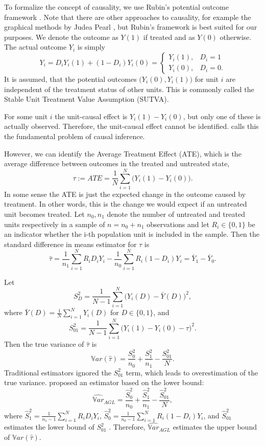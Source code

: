 \documentclass[aodsor,preprint]{imsart}
\numberwithin{equation}{section}
\theoremstyle{plain}
\newcommand{\Var}{{\mathbb{V}ar}}
\begin{document}
To formalize the concept of causality, we use Rubin's potential outcome framework \citep{Rubin_2005}. Note that there are other approaches to causality, for example the graphical methods by Judea Pearl \citep[see for example][]{Pearl_2009}, but Rubin's framework is best suited for our purposes. We denote the outcome as $Y(1)$ if treated and as $Y(0)$ otherwise. The actual outcome $Y_i$ is simply
$$
Y_i = D_i Y_i(1) + (1-D_i) Y_i(0) = \begin{cases}
	Y_i(1), & D_i = 1 \\
	Y_i(0), & D_i = 0.
\end{cases}
$$
It is assumed, that the potential outcomes $\big(Y_i(0), Y_i(1)\big)$ for unit $i$ are independent of the treatment status of other units. This is commonly called the Stable Unit Treatment Value Assumption (SUTVA).

For some unit $i$ the unit-causal effect is $Y_i(1) - Y_i(0)$, but only one of these is actually observed. Therefore, the unit-causal effect cannot be identified. \cite{Holland_1986} calls this the fundamental problem of causal inference.

However, we can identify the Average Treatment Effect (ATE), which is the average difference between outcomes in the treated and untreated state,
$$
\tau := ATE = \frac{1}{N} \sum_{i = 1}^{N} \big( Y_i(1) - Y_i(0) \big).
$$
In some sense the ATE is just the expected change in the outcome caused by treatment. In other words, this is the change we would expect if an untreated unit becomes treated. Let $n_0, n_1$ denote the number of untreated and treated units respectively in a sample of $n = n_0 + n_1$ observations and let $R_i \in \{0, 1\}$ be an indicator whether the i-th population unit is included in the sample. Then the standard difference in means estimator for $\tau$ is
$$
\widehat{\tau} = \frac{1}{n_1} \sum_{i = 1}^{N} R_i D_i Y_i - \frac{1}{n_0} \sum_{i = 1}^{N} R_i (1 - D_i) Y_i = \bar{Y}_1 - \bar{Y}_0.
$$

Let
$$S_D^2 = \frac{1}{N-1} \sum_{i = 1}^{N} \big(Y_i(D) - \bar{Y}(D) \big)^2,$$
where $\bar{Y}(D) = \frac{1}{N} \sum_{i = 1}^{N} Y_i(D)$ for $D\in \{0, 1\}$, and
$$S_{01}^2 = \frac{1}{N-1} \sum_{i = 1}^{N} \big( Y_i(1) - Y_i(0) - \tau \big)^2.$$ Then the true variance of $\widehat{\tau}$ is
$$
\Var(\widehat{\tau}) = \frac{S_0^2}{n_0} + \frac{S_1^2}{n_1} - \frac{S_{01}^2}{N}.
$$
Traditional estimators ignored the $S_{01}^2$ term, which leads to overestimation of the true variance. \cite{aronow_2014} proposed an estimator based on the lower bound:
$$
\widehat{\Var}_{AGL} = \frac{\widehat{S}_0^2}{n_0} + \frac{\widehat{S}_1^2}{n_1} - \frac{\widehat{S}_{01}^2}{N},
$$
where $\widehat{S}_1^2 = \frac{1}{n_1 - 1} \sum_{i = 1}^{N} R_i D_i Y_i$, $\widehat{S}_0^2 = \frac{1}{n_0 - 1} \sum_{i = 1}^{N} R_i (1 - D_i) Y_i$, and $\widehat{S}_{01}^2$ estimates the lower bound of $S_{01}^2$ \citep[see][Section 3]{aronow_2014}. Therefore, $\widehat{\Var}_{AGL}$ estimates the upper bound of $\Var(\widehat{\tau})$.
\end{document}
